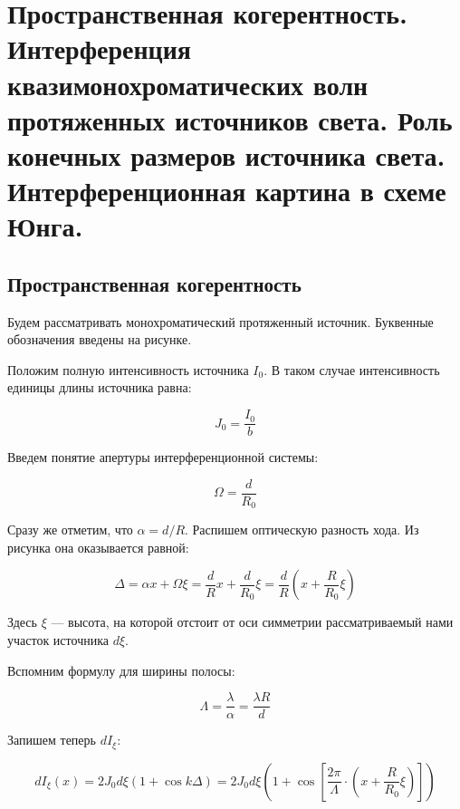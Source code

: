 \section{Пространственная когерентность. Интерференция квазимонохроматических волн протяженных источников света. Роль конечных размеров источника света. Интерференционная картина в схеме Юнга.}

\subsection{Пространственная когерентность}

Будем рассматривать монохроматический протяженный источник. Буквенные обозначения введены на рисунке. %

Положим полную интенсивность источника $I_0$. В таком случае интенсивность единицы длины источника равна:

\begin{equation*}
	J_0 = \frac{I_0}{b}
\end{equation*}

Введем понятие апертуры интерференционной системы:

\begin{equation*}
	\Omega = \frac{d}{R_0}
\end{equation*}

Сразу же отметим, что $\alpha = d / R$. Распишем оптическую разность хода. Из рисунка она оказывается равной:

\begin{equation*}
	\Delta = \alpha x + \Omega \xi = \frac{d}{R} x + \frac{d}{R_0} \xi = \frac{d}{R} \left(x + \frac{R}{R_0} \xi\right)
\end{equation*}

Здесь $\xi$ --- высота, на которой отстоит от оси симметрии рассматриваемый нами участок источника $d \xi$.

Вспомним формулу для ширины полосы:

\begin{equation*}
	\Lambda = \frac{\lambda}{\alpha} = \frac{\lambda R}{d}
\end{equation*}

Запишем теперь $dI_\xi$:

\begin{equation*}
	dI_\xi(x) = 2 J_0 d\xi (1 + \cos k \Delta) = 2 J_0 d\xi \left(1 + \cos\left[ \frac{2\pi}{\Lambda} \cdot \left(x + \frac{R}{R_0} \xi\right)\right]\right)
\end{equation*}

